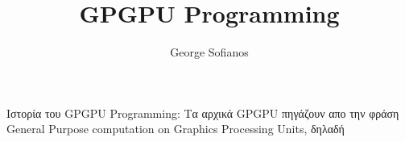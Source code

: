 \documentclass[11pt,a4paper,draft]{book}
\author{George Sofianos}
\title{GPGPU Programming}
\begin{document}
Ιστορία του GPGPU Programming:
Τα αρχικά GPGPU πηγάζουν απο την φράση General Purpose computation on Graphics Processing Units, δηλαδή 
\end{document}
